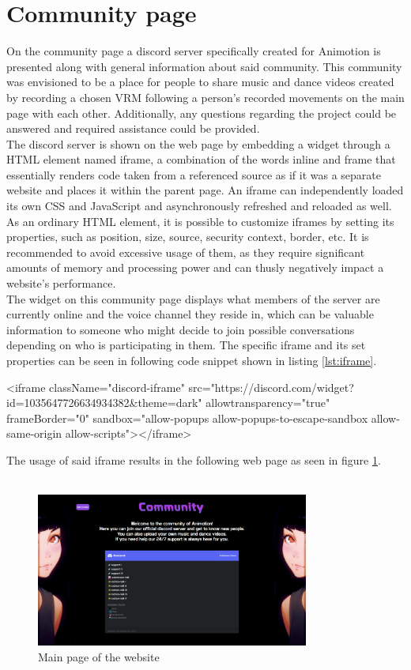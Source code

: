 \section{Community page}
On the community page a discord server specifically created for Animotion is presented along with
general information about said community. This community was envisioned to be a place for people
to share music and dance videos created by recording a chosen VRM following a person's recorded
movements on the main page with each other. Additionally, any questions regarding the project could
be answered and required assistance could be provided. \\
The discord server is shown on the web page by embedding a widget through a HTML element named
iframe, a combination of the words inline and frame that essentially renders code taken from a
referenced source as if it was a separate website and places it within the parent page. An iframe
can independently loaded its own CSS and JavaScript and asynchronously refreshed and reloaded as
well. As an ordinary HTML element, it is possible to customize iframes by setting its properties,
such as position, size, source, security context, border, etc. It is recommended to avoid excessive
usage of them, as they require significant amounts of memory and processing power and can thusly
negatively impact a website's performance. \\ %
The widget on this community page displays what members of the server are currently online and the
voice channel they reside in, which can be valuable information to someone who might decide to join
possible conversations depending on who is participating in them.
The specific iframe and its set properties can be seen in following code snippet shown in listing \ref{lst:iframe}.
\begin{iframediscord}[language=Python,caption=iframe used for discord widget,label=lst:iframe]
    <iframe className="discord-iframe" src="https://discord.com/widget?id=1035647726634934382&theme=dark"
    allowtransparency="true" frameBorder="0" sandbox="allow-popups allow-popups-to-escape-sandbox allow-same-origin allow-scripts"></iframe>
\end{iframediscord}
The usage of said iframe results in the following web page as seen in figure \ref{fig:communitypage}.
\\
\\
\begin{figure}[htb]
    \centering
    \includegraphics[width=0.8\textwidth]{pics/Animotion_community.png}
    \caption{Main page of the website}
    \label{fig:communitypage}
\end{figure}
